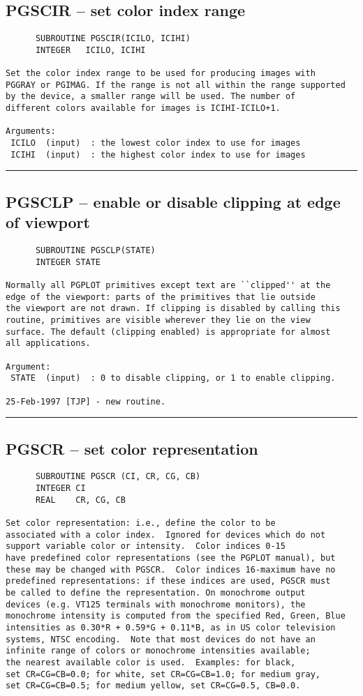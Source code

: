 {\subsection*{PGSCIR -- set color index range }
\begin{verbatim}
      SUBROUTINE PGSCIR(ICILO, ICIHI)
      INTEGER   ICILO, ICIHI

Set the color index range to be used for producing images with
PGGRAY or PGIMAG. If the range is not all within the range supported
by the device, a smaller range will be used. The number of
different colors available for images is ICIHI-ICILO+1.

Arguments:
 ICILO  (input)  : the lowest color index to use for images
 ICIHI  (input)  : the highest color index to use for images
\end{verbatim}
\hrule


\subsection*{PGSCLP -- enable or disable clipping at edge of viewport }
\begin{verbatim}
      SUBROUTINE PGSCLP(STATE)
      INTEGER STATE

Normally all PGPLOT primitives except text are ``clipped'' at the
edge of the viewport: parts of the primitives that lie outside
the viewport are not drawn. If clipping is disabled by calling this
routine, primitives are visible wherever they lie on the view
surface. The default (clipping enabled) is appropriate for almost
all applications.

Argument:
 STATE  (input)  : 0 to disable clipping, or 1 to enable clipping.

25-Feb-1997 [TJP] - new routine.
\end{verbatim}
\hrule


\subsection*{PGSCR -- set color representation }
\begin{verbatim}
      SUBROUTINE PGSCR (CI, CR, CG, CB)
      INTEGER CI
      REAL    CR, CG, CB

Set color representation: i.e., define the color to be
associated with a color index.  Ignored for devices which do not
support variable color or intensity.  Color indices 0-15
have predefined color representations (see the PGPLOT manual), but
these may be changed with PGSCR.  Color indices 16-maximum have no
predefined representations: if these indices are used, PGSCR must
be called to define the representation. On monochrome output
devices (e.g. VT125 terminals with monochrome monitors), the
monochrome intensity is computed from the specified Red, Green, Blue
intensities as 0.30*R + 0.59*G + 0.11*B, as in US color television
systems, NTSC encoding.  Note that most devices do not have an
infinite range of colors or monochrome intensities available;
the nearest available color is used.  Examples: for black,
set CR=CG=CB=0.0; for white, set CR=CG=CB=1.0; for medium gray,
set CR=CG=CB=0.5; for medium yellow, set CR=CG=0.5, CB=0.0.


\end{verbatim}}
